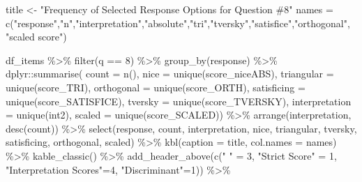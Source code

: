 \documentclass[
  letterpaper,
  DIV=11,
  numbers=noendperiod]{scrreprt}
\newenvironment{Shaded}{\begin{snugshade}}{\end{snugshade}}
\newcommand{\AttributeTok}[1]{\textcolor[rgb]{0.40,0.45,0.13}{#1}}
\newcommand{\DecValTok}[1]{\textcolor[rgb]{0.68,0.00,0.00}{#1}}
\newcommand{\FunctionTok}[1]{\textcolor[rgb]{0.28,0.35,0.67}{#1}}
\newcommand{\NormalTok}[1]{\textcolor[rgb]{0.00,0.23,0.31}{#1}}
\newcommand{\OtherTok}[1]{\textcolor[rgb]{0.00,0.23,0.31}{#1}}
\newcommand{\SpecialCharTok}[1]{\textcolor[rgb]{0.37,0.37,0.37}{#1}}
\newcommand{\StringTok}[1]{\textcolor[rgb]{0.13,0.47,0.30}{#1}}
\begin{document}
\begin{Shaded}
\begin{Highlighting}[]
\NormalTok{title }\OtherTok{\textless{}{-}} \StringTok{"Frequency of Selected Response Options for Question \#8"}
\NormalTok{names }\OtherTok{=} \FunctionTok{c}\NormalTok{(}\StringTok{"response"}\NormalTok{,}\StringTok{"n"}\NormalTok{,}\StringTok{"interpretation"}\NormalTok{,}\StringTok{"absolute"}\NormalTok{,}\StringTok{"tri"}\NormalTok{,}\StringTok{"tversky"}\NormalTok{,}\StringTok{"satisfice"}\NormalTok{,}\StringTok{"orthogonal"}\NormalTok{, }\StringTok{"scaled score"}\NormalTok{)}

\NormalTok{df\_items }\SpecialCharTok{\%\textgreater{}\%} \FunctionTok{filter}\NormalTok{(q }\SpecialCharTok{==} \DecValTok{8}\NormalTok{) }\SpecialCharTok{\%\textgreater{}\%} \FunctionTok{group\_by}\NormalTok{(response) }\SpecialCharTok{\%\textgreater{}\%}
\NormalTok{  dplyr}\SpecialCharTok{::}\FunctionTok{summarise}\NormalTok{( }\AttributeTok{count =} \FunctionTok{n}\NormalTok{(),}
                    \AttributeTok{nice =} \FunctionTok{unique}\NormalTok{(score\_niceABS),}
                    \AttributeTok{triangular =} \FunctionTok{unique}\NormalTok{(score\_TRI),}
                    \AttributeTok{orthogonal =}  \FunctionTok{unique}\NormalTok{(score\_ORTH),}
                    \AttributeTok{satisficing =}  \FunctionTok{unique}\NormalTok{(score\_SATISFICE),}
                    \AttributeTok{tversky =} \FunctionTok{unique}\NormalTok{(score\_TVERSKY),}
                    \AttributeTok{interpretation =} \FunctionTok{unique}\NormalTok{(int2),}
                    \AttributeTok{scaled =} \FunctionTok{unique}\NormalTok{(score\_SCALED)) }\SpecialCharTok{\%\textgreater{}\%}
  \FunctionTok{arrange}\NormalTok{(interpretation, }\FunctionTok{desc}\NormalTok{(count)) }\SpecialCharTok{\%\textgreater{}\%}
  \FunctionTok{select}\NormalTok{(response, count, interpretation, nice,}
\NormalTok{         triangular, tversky, satisficing, orthogonal, scaled) }\SpecialCharTok{\%\textgreater{}\%}
  \FunctionTok{kbl}\NormalTok{(}\AttributeTok{caption =}\NormalTok{ title, }\AttributeTok{col.names =}\NormalTok{ names) }\SpecialCharTok{\%\textgreater{}\%}  \FunctionTok{kable\_classic}\NormalTok{() }\SpecialCharTok{\%\textgreater{}\%}
  \FunctionTok{add\_header\_above}\NormalTok{(}\FunctionTok{c}\NormalTok{(}\StringTok{" "} \OtherTok{=} \DecValTok{3}\NormalTok{, }\StringTok{"Strict Score"} \OtherTok{=} \DecValTok{1}\NormalTok{, }\StringTok{"Interpretation Scores"}\OtherTok{=}\DecValTok{4}\NormalTok{, }\StringTok{"Discriminant"}\OtherTok{=}\DecValTok{1}\NormalTok{)) }\SpecialCharTok{\%\textgreater{}\%}

\end{Highlighting}
\end{Shaded}
\end{document}
